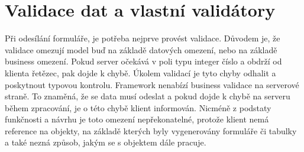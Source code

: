 \section{Validace dat a vlastní validátory}
Při odesílání formuláře, je potřeba nejprve provést validace. Důvodem je, že validace omezují model buď na základě datových omezení, nebo na základě business omezení. Pokud server očekává v poli typu integer číslo a obdrží od klienta řetězec, pak dojde k chybě. Úkolem validací je tyto chyby odhalit a poskytnout typovou kontrolu. Framework nenabízí business validace na serverové straně. To znaměná, že se data musí odeslat a pokud dojde k chybě na serveru během zpracování, je o této chybě klient informován. Nicméně z podstaty funkčnosti a návrhu je toto omezení nepřekonatelné, protože klient nemá reference na objekty, na základě kterých byly vygenerovány formuláře či tabulky a také nezná způsob, jakým se s objektem dále pracuje. 
